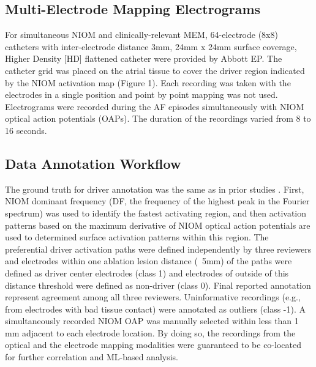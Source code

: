 \documentclass{article}
\begin{document}
\subsection{Multi-Electrode Mapping Electrograms}

For simultaneous NIOM and clinically-relevant MEM, 64-electrode (8x8) catheters with inter-electrode distance 3mm, 24mm x 24mm surface coverage, Higher Density [HD] flattened catheter \cite{Hansen2018a, Hansen2018} were provided by Abbott EP. The catheter grid was placed on the atrial tissue to cover the driver region indicated by the NIOM activation map (Figure 1).  Each recording was taken with the electrodes in a single position and point by point mapping was not used. Electrograms were recorded during the AF episodes simultaneously with NIOM optical action potentials (OAPs). The duration of the recordings varied from 8 to 16 seconds. 

\subsection{Data Annotation Workflow}

The ground truth for driver annotation  was the same as in prior studies \cite{Hansen2015, Hansen2018}. First, NIOM dominant frequency (DF, the frequency of the highest peak in the Fourier spectrum) was used to identify the fastest activating region, and then activation patterns based on the maximum derivative of NIOM optical action potentials are used to determined surface activation patterns within this region. The preferential driver activation paths were defined independently by three reviewers and electrodes within one ablation lesion distance (~5mm) of the paths were defined as driver center electrodes (class 1) and electrodes of outside of this distance threshold were defined as non-driver (class 0). Final reported annotation represent agreement among all three reviewers. Uninformative recordings (e.g., from electrodes with bad tissue contact) were annotated as outliers (class -1). A simultaneously recorded NIOM OAP was manually selected within less than 1 mm adjacent to each electrode location. By doing so, the recordings from the optical and the electrode mapping modalities were guaranteed to be co-located for further correlation and ML-based analysis.
\end{document}
